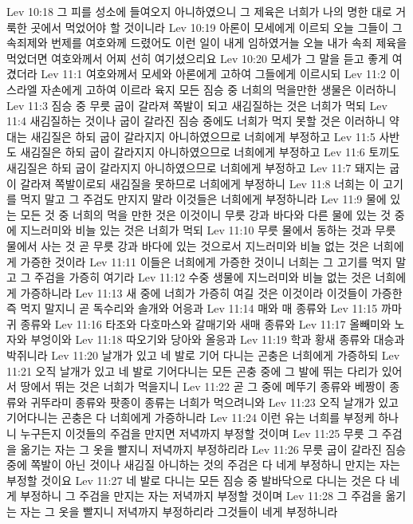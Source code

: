 Lev 10:18  그 피를 성소에 들여오지 아니하였으니 그 제육은 너희가 나의 명한 대로 거룩한 곳에서 먹었어야 할 것이니라
Lev 10:19  아론이 모세에게 이르되 오늘 그들이 그 속죄제와 번제를 여호와께 드렸어도 이런 일이 내게 임하였거늘 오늘 내가 속죄 제육을 먹었더면 여호와께서 어찌 선히 여기셨으리요
Lev 10:20  모세가 그 말을 듣고 좋게 여겼더라
Lev 11:1  여호와께서 모세와 아론에게 고하여 그들에게 이르시되
Lev 11:2  이스라엘 자손에게 고하여 이르라 육지 모든 짐승 중 너희의 먹을만한 생물은 이러하니
Lev 11:3  짐승 중 무릇 굽이 갈라져 쪽발이 되고 새김질하는 것은 너희가 먹되
Lev 11:4  새김질하는 것이나 굽이 갈라진 짐승 중에도 너희가 먹지 못할 것은 이러하니 약대는 새김질은 하되 굽이 갈라지지 아니하였으므로 너희에게 부정하고
Lev 11:5  사반도 새김질은 하되 굽이 갈라지지 아니하였으므로 너희에게 부정하고
Lev 11:6  토끼도 새김질은 하되 굽이 갈라지지 아니하였으므로 너희에게 부정하고
Lev 11:7  돼지는 굽이 갈라져 쪽발이로되 새김질을 못하므로 너희에게 부정하니
Lev 11:8  너희는 이 고기를 먹지 말고 그 주검도 만지지 말라 이것들은 너희에게 부정하니라
Lev 11:9  물에 있는 모든 것 중 너희의 먹을 만한 것은 이것이니 무릇 강과 바다와 다른 물에 있는 것 중에 지느러미와 비늘 있는 것은 너희가 먹되
Lev 11:10  무릇 물에서 동하는 것과 무릇 물에서 사는 것 곧 무릇 강과 바다에 있는 것으로서 지느러미와 비늘 없는 것은 너희에게 가증한 것이라
Lev 11:11  이들은 너희에게 가증한 것이니 너희는 그 고기를 먹지 말고 그 주검을 가증히 여기라
Lev 11:12  수중 생물에 지느러미와 비늘 없는 것은 너희에게 가증하니라
Lev 11:13  새 중에 너희가 가증히 여길 것은 이것이라 이것들이 가증한즉 먹지 말지니 곧 독수리와 솔개와 어응과
Lev 11:14  매와 매 종류와
Lev 11:15  까마귀 종류와
Lev 11:16  타조와 다호마스와 갈매기와 새매 종류와
Lev 11:17  올빼미와 노자와 부엉이와
Lev 11:18  따오기와 당아와 올응과
Lev 11:19  학과 황새 종류와 대승과 박쥐니라
Lev 11:20  날개가 있고 네 발로 기어 다니는 곤충은 너희에게 가증하되
Lev 11:21  오직 날개가 있고 네 발로 기어다니는 모든 곤충 중에 그 발에 뛰는 다리가 있어서 땅에서 뛰는 것은 너희가 먹을지니
Lev 11:22  곧 그 중에 메뚜기 종류와 베짱이 종류와 귀뚜라미 종류와 팟종이 종류는 너희가 먹으려니와
Lev 11:23  오직 날개가 있고 기어다니는 곤충은 다 너희에게 가증하니라
Lev 11:24  이런 유는 너희를 부정케 하나니 누구든지 이것들의 주검을 만지면 저녁까지 부정할 것이며
Lev 11:25  무릇 그 주검을 옮기는 자는 그 옷을 빨지니 저녁까지 부정하리라
Lev 11:26  무릇 굽이 갈라진 짐승 중에 쪽발이 아닌 것이나 새김질 아니하는 것의 주검은 다 네게 부정하니 만지는 자는 부정할 것이요
Lev 11:27  네 발로 다니는 모든 짐승 중 발바닥으로 다니는 것은 다 네게 부정하니 그 주검을 만지는 자는 저녁까지 부정할 것이며
Lev 11:28  그 주검을 옮기는 자는 그 옷을 빨지니 저녁까지 부정하리라 그것들이 네게 부정하니라
